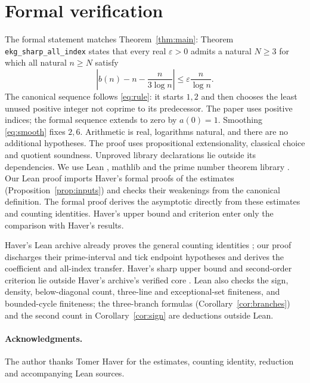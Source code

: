 \documentclass[11pt]{article}
\theoremstyle{remark}
\newcommand{\eps}{\varepsilon}
\begin{document}
\section{Formal verification}\label{sec:lean}
The formal statement matches Theorem~\ref{thm:main}:
Theorem \texttt{ekg\_sharp\_all\_index} states that every
real $\eps>0$ admits a natural $N\geq3$ for which all natural
$n\geq N$ satisfy
\[
 \left|b(n)-n-\frac{n}{3\log n}\right|
       \leq \eps\frac{n}{\log n}.
\]
The canonical sequence follows \eqref{eq:rule}: it starts $1,2$ and then chooses the
least unused positive integer not coprime to its predecessor.
The paper uses positive indices; the formal sequence extends to zero
by $a(0)=1$.
Smoothing \eqref{eq:smooth} fixes $2,6$. Arithmetic is real, logarithms natural, and there are no additional
hypotheses. The proof uses propositional extensionality,
classical choice and quotient soundness. Unproved library
declarations lie outside its dependencies.
We use Lean \cite{lean}, mathlib \cite{mathlib} and the prime
number theorem library \cite{pntcode}. Our Lean proof imports Haver's formal proofs of the estimates
(Proposition~\ref{prop:inputs}) and checks their weakenings from the
canonical definition. The formal proof derives the asymptotic directly
from these estimates and counting identities. Haver's upper bound and
criterion enter only the comparison with Haver's results.

Haver's Lean archive already proves the general counting identities
\cite[Corollary~12(b)]{haver};
our proof discharges their prime-interval and tick endpoint hypotheses
and derives the coefficient and all-index transfer. Haver's sharp upper bound and second-order
criterion lie outside Haver's archive's verified core
\cite[verification note, ``Claims outside the checked coverage'']{haver}. Lean also checks the sign, density, below-diagonal count, three-line and
exceptional-set finiteness, and bounded-cycle finiteness; the three-branch
formulas (Corollary~\ref{cor:branches}) and the second count in
Corollary~\ref{cor:sign} are deductions outside Lean.

\paragraph{Acknowledgments.}
The author thanks Tomer Haver for the estimates, counting identity,
reduction and accompanying Lean sources.
\end{document}

